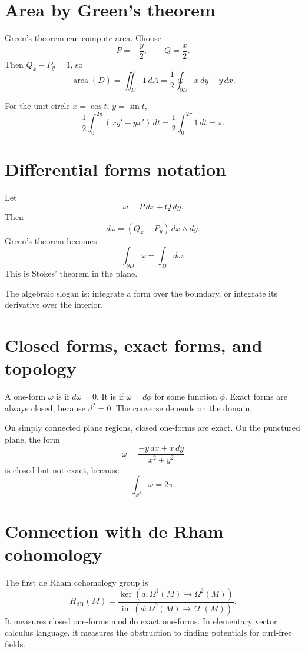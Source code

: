 \section{Area by Green's theorem}

Green's theorem can compute area.  Choose
\[
  P=-\frac{y}{2},\qquad Q=\frac{x}{2}.
\]
Then \(Q_x-P_y=1\), so
\[
  \operatorname{area}(D)=\iint_D1\,dA
  =\frac{1}{2}\oint_{\partial D}x\,dy-y\,dx.
\]

\begin{example}
For the unit circle \(x=\cos t\), \(y=\sin t\),
\[
  \frac{1}{2}\int_0^{2\pi}(x y'-y x')\,dt
  =\frac{1}{2}\int_0^{2\pi}1\,dt=\pi.
\]
\end{example}

\section{Differential forms notation}

Let
\[
  \omega=P\,dx+Q\,dy.
\]
Then
\[
  d\omega=(Q_x-P_y)\,dx\wedge dy.
\]
Green's theorem becomes
\[
  \int_{\partial D}\omega=\int_D d\omega.
\]
This is Stokes' theorem in the plane.

The algebraic slogan is: integrate a form over the boundary, or integrate its derivative over the interior.

\section{Closed forms, exact forms, and topology}

A one-form \(\omega\) is  if \(d\omega=0\).  It is  if \(\omega=d\phi\) for some function \(\phi\).  Exact forms are always closed, because \(d^2=0\).  The converse depends on the domain.

On simply connected plane regions, closed one-forms are exact.  On the punctured plane, the form
\[
  \omega=\frac{-y\,dx+x\,dy}{x^2+y^2}
\]
is closed but not exact, because
\[
  \int_{S^1}\omega=2\pi.
\]

\section{Connection with de Rham cohomology}

The first de Rham cohomology group is
\[
  H^1_{\mathrm{dR}}(M)
  =\frac{\ker(d:\Omega^1(M)\to\Omega^2(M))}
    {\operatorname{im}(d:\Omega^0(M)\to\Omega^1(M))}.
\]
It measures closed one-forms modulo exact one-forms.  In elementary vector calculus language, it measures the obstruction to finding potentials for curl-free fields.

